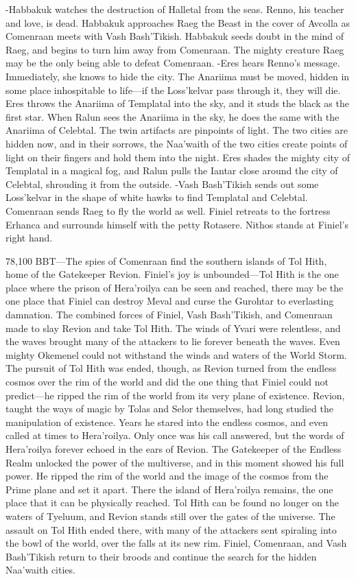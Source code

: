 \documentclass[smalldemyvopaper,11pt,twoside,onecolumn,openright,extrafontsizes]{memoir}
\begin{document}
-Habbakuk watches the destruction of Halletal from the seas. Renno, his teacher and love, is dead. Habbakuk approaches Raeg the Beast in the cover of Avcolla as Comenraan meets with Vash Bash’Tikish. Habbakuk seeds doubt in the mind of Raeg, and begins to turn him away from Comenraan. The mighty creature Raeg may be the only being able to defeat Comenraan.
-Eres hears Renno’s message. Immediately, she knows to hide the city. The Anariima must be moved, hidden in some place inhospitable to life—if the Loss’kelvar pass through it, they will die. Eres throws the Anariima of Templatal into the sky, and it studs the black as the first star.  When Ralun sees the Anariima in the sky, he does the same with the Anariima of Celebtal. The twin artifacts are pinpoints of light. The two cities are hidden now, and in their sorrows, the Naa’waith of the two cities create points of light on their fingers and hold them into the night. Eres shades the mighty city of Templatal in a magical fog, and Ralun pulls the Iantar close around the city of Celebtal, shrouding it from the outside.
-Vash Bash’Tikish sends out some Loss’kelvar in the shape of white hawks to find Templatal and Celebtal. Comenraan sends Raeg to fly the world as well. Finiel retreats to the fortress Erhanca and surrounds himself with the petty Rotasere. Nithos stands at Finiel’s right hand.

78,100 BBT—The spies of Comenraan find the southern islands of Tol Hith, home of the Gatekeeper Revion. Finiel’s joy is unbounded—Tol Hith is the one place where the prison of Hera’roilya can be seen and reached, there may be the one place that Finiel can destroy Meval and curse the Gurohtar to everlasting damnation. The combined forces of Finiel, Vash Bash’Tikish, and Comenraan made to slay Revion and take Tol Hith. The winds of Yvari were relentless, and the waves brought many of the attackers to lie forever beneath the waves. Even mighty Okemenel could not withstand the winds and waters of the World Storm. The pursuit of Tol Hith was ended, though, as Revion turned from the endless cosmos over the rim of the world and did the one thing that Finiel could not predict—he ripped the rim of the world from its very plane of existence. Revion, taught the ways of magic by Tolas and Selor themselves, had long studied the manipulation of existence. Years he stared into the endless cosmos, and even called at times to Hera’roilya. Only once was his call answered, but the words of Hera’roilya forever echoed in the ears of Revion. The Gatekeeper of the Endless Realm unlocked the power of the multiverse, and in this moment showed his full power. He ripped the rim of the world and the image of the cosmos from the Prime plane and set it apart. There the island of Hera’roilya remains, the one place that it can be physically reached. Tol Hith can be found no longer on the waters of Tyeluum, and Revion stands still over the gates of the universe. The assault on Tol Hith ended there, with many of the attackers sent spiraling into the bowl of the world, over the falls at its new rim. Finiel, Comenraan, and Vash Bash’Tikish return to their broods and continue the search for the hidden Naa’waith cities.
\end{document}
